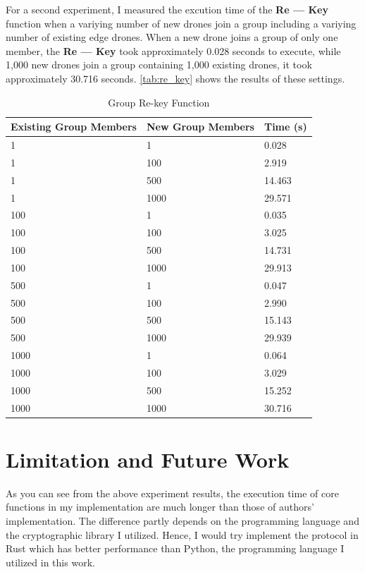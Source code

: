 \documentclass{article}
\begin{document}
For a second experiment, I measured the excution time of the \textbf{Re --- Key}
function when a variying number of new drones join a group including a variying
number of existing edge drones. When a new drone joins a group of only one member,
the \textbf{Re --- Key} took approximately 0.028 seconds to execute, while 1,000 new
drones join a group containing 1,000 existing drones, it took approximately 30.716
seconds. \autoref{tab:re_key} shows the results of these settings.

\begin{table}[!ht]
    \centering
    \begin{tabular}{|l|l|l|}
    \hline
        \textbf{Existing Group Members} & \textbf{New Group Members} & \textbf{Time (s)} \\ \hline
        1 & 1 & 0.028 \\ \hline
        1 & 100 & 2.919 \\ \hline
        1 & 500 & 14.463 \\ \hline
        1 & 1000 & 29.571 \\ \hline
        100 & 1 & 0.035 \\ \hline
        100 & 100 & 3.025 \\ \hline
        100 & 500 & 14.731 \\ \hline
        100 & 1000 & 29.913 \\ \hline
        500 & 1 & 0.047 \\ \hline
        500 & 100 & 2.990 \\ \hline
        500 & 500 & 15.143 \\ \hline
        500 & 1000 & 29.939 \\ \hline
        1000 & 1 & 0.064 \\ \hline
        1000 & 100 & 3.029 \\ \hline
        1000 & 500 & 15.252 \\ \hline
        1000 & 1000 & 30.716 \\ \hline
    \end{tabular}
    \caption{Group Re-key Function}\label{tab:re_key}
\end{table}

\section{Limitation and Future Work}
%
As you can see from the above experiment results, the execution time of core
functions in my implementation are much longer than those of authors' implementation.
The difference partly depends on the programming language and the cryptographic
library I utilized. Hence, I would try implement the protocol in Rust which has
better performance than Python, the programming language I utilized in this work.

\printbibliography{}
\end{document}
